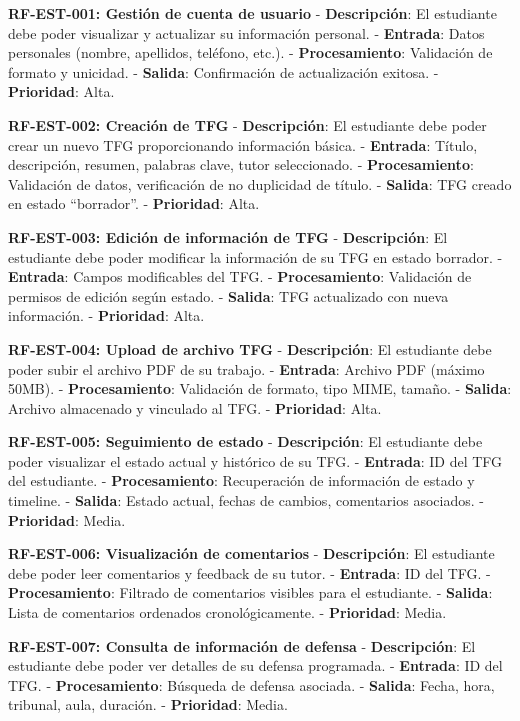 \documentclass[12pt,a4paper,oneside]{report}
\begin{document}
\textbf{RF-EST-001: Gestión de cuenta de usuario} -
\textbf{Descripción}: El estudiante debe poder visualizar y actualizar
su información personal. - \textbf{Entrada}: Datos personales (nombre,
apellidos, teléfono, etc.). - \textbf{Procesamiento}: Validación de
formato y unicidad. - \textbf{Salida}: Confirmación de actualización
exitosa. - \textbf{Prioridad}: Alta.

\textbf{RF-EST-002: Creación de TFG} - \textbf{Descripción}: El
estudiante debe poder crear un nuevo TFG proporcionando información
básica. - \textbf{Entrada}: Título, descripción, resumen, palabras
clave, tutor seleccionado. - \textbf{Procesamiento}: Validación de
datos, verificación de no duplicidad de título. - \textbf{Salida}: TFG
creado en estado ``borrador''. - \textbf{Prioridad}: Alta.

\textbf{RF-EST-003: Edición de información de TFG} -
\textbf{Descripción}: El estudiante debe poder modificar la información
de su TFG en estado borrador. - \textbf{Entrada}: Campos modificables
del TFG. - \textbf{Procesamiento}: Validación de permisos de edición
según estado. - \textbf{Salida}: TFG actualizado con nueva información.
- \textbf{Prioridad}: Alta.

\textbf{RF-EST-004: Upload de archivo TFG} - \textbf{Descripción}: El
estudiante debe poder subir el archivo PDF de su trabajo. -
\textbf{Entrada}: Archivo PDF (máximo 50MB). - \textbf{Procesamiento}:
Validación de formato, tipo MIME, tamaño. - \textbf{Salida}: Archivo
almacenado y vinculado al TFG. - \textbf{Prioridad}: Alta.

\textbf{RF-EST-005: Seguimiento de estado} - \textbf{Descripción}: El
estudiante debe poder visualizar el estado actual y histórico de su TFG.
- \textbf{Entrada}: ID del TFG del estudiante. - \textbf{Procesamiento}:
Recuperación de información de estado y timeline. - \textbf{Salida}:
Estado actual, fechas de cambios, comentarios asociados. -
\textbf{Prioridad}: Media.

\textbf{RF-EST-006: Visualización de comentarios} -
\textbf{Descripción}: El estudiante debe poder leer comentarios y
feedback de su tutor. - \textbf{Entrada}: ID del TFG. -
\textbf{Procesamiento}: Filtrado de comentarios visibles para el
estudiante. - \textbf{Salida}: Lista de comentarios ordenados
cronológicamente. - \textbf{Prioridad}: Media.

\textbf{RF-EST-007: Consulta de información de defensa} -
\textbf{Descripción}: El estudiante debe poder ver detalles de su
defensa programada. - \textbf{Entrada}: ID del TFG. -
\textbf{Procesamiento}: Búsqueda de defensa asociada. - \textbf{Salida}:
Fecha, hora, tribunal, aula, duración. - \textbf{Prioridad}: Media.
\end{document}
